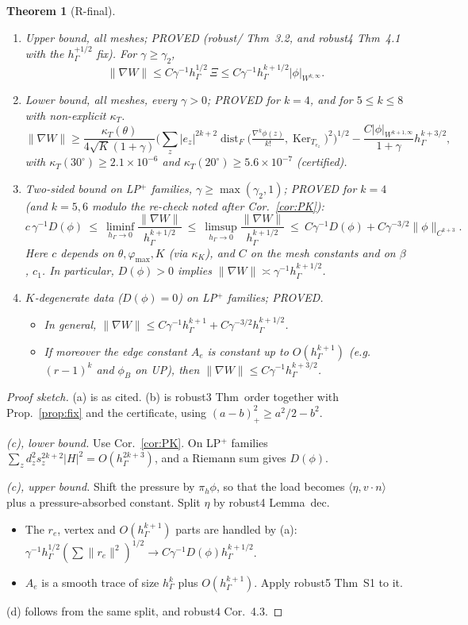 \documentclass[11pt]{article}
\newtheorem{theorem}{Theorem}[section]
\theoremstyle{remark}
\newcommand{\hG}{h_\Gamma}
\newcommand{\ip}[2]{\langle #1,#2\rangle}
\begin{document}
\begin{theorem}[R-final]
\begin{enumerate}
\item[(a)] \emph{Upper bound, all meshes; PROVED} (robust/ Thm~3.2, and robust4 Thm~4.1 with the $\hG^{+1/2}$ fix). For $\gamma\ge\gamma_2$,
\[
\|\nabla W\|\le C\gamma^{-1}\hG^{1/2}\,\Xi\le C\gamma^{-1}\hG^{k+1/2}|\phi|_{W^{k,\infty}}.
\]
\item[(b)] \emph{Lower bound, all meshes, every $\gamma>0$; PROVED for $k=4$, and for $5\le k\le8$ with non-explicit $\kappa_T$.}
\[
\|\nabla W\|\ge\frac{\kappa_T(\theta)}{4\sqrt K(1+\gamma)}\Big(\sum_z|e_z|^{2k+2}\operatorname{dist}_F\big(\tfrac{\nabla^k\phi(z)}{k!},\operatorname{Ker}_{T_{e_z}}\big)^2\Big)^{1/2}
-\frac{C|\phi|_{W^{k+1,\infty}}}{1+\gamma}\hG^{k+3/2},
\]
with $\kappa_T(30^\circ)\ge2.1\times10^{-6}$ and $\kappa_T(20^\circ)\ge5.6\times10^{-7}$ (certified).
\item[(c)] \emph{Two-sided bound on LP$^+$ families, $\gamma\ge\max(\gamma_2,1)$; PROVED for $k=4$} (and $k=5,6$ modulo the re-check noted
after Cor.~\ref{cor:PK}):
\[
c\,\gamma^{-1}D(\phi)\ \le\ \liminf_{\hG\to0}\frac{\|\nabla W\|}{\hG^{k+1/2}}\ \le\ \limsup_{\hG\to0}\frac{\|\nabla W\|}{\hG^{k+1/2}}\ \le\
C\gamma^{-1}D(\phi)+C\gamma^{-3/2}\|\phi\|_{C^{k+3}} .
\]
Here $c$ depends on $\theta,\varphi_{\max},K$ (via $\kappa_K$), and $C$ on the mesh constants and on $\beta$, $c_1$. In particular, $D(\phi)>0$
implies $\|\nabla W\|\asymp\gamma^{-1}\hG^{k+1/2}$.
\item[(d)] \emph{$K$-degenerate data ($D(\phi)=0$) on LP$^+$ families; PROVED.}
\begin{itemize}
\item In general, $\|\nabla W\|\le C\gamma^{-1}\hG^{k+1}+C\gamma^{-3/2}\hG^{k+1/2}$.
\item If moreover the edge constant $A_e$ is constant up to $O(\hG^{k+1})$ (e.g.\ $(r-1)^k$ and $\phi_B$ on \textsf{UP}), then
$\|\nabla W\|\le C\gamma^{-1}\hG^{k+3/2}$.
\end{itemize}
\end{enumerate}
\end{theorem}
\begin{proof}[Proof sketch]
(a) is as cited. (b) is robust3 Thm~order together with Prop.~\ref{prop:fix} and the certificate, using $(a-b)_+^2\ge a^2/2-b^2$.

\emph{(c), lower bound.} Use Cor.~\ref{cor:PK}. On LP$^+$ families $\sum_zd_z^2s_z^{2k+2}|H|^2=O(\hG^{2k+3})$, and a Riemann sum gives $D(\phi)$.

\emph{(c), upper bound.} Shift the pressure by $\pi_h\phi$, so that the load becomes $\ip\eta{v\cdot n}$ plus a pressure-absorbed constant. Split $\eta$
by robust4 Lemma~dec.
\begin{itemize}
\item The $r_e$, vertex and $O(\hG^{k+1})$ parts are handled by (a): $\gamma^{-1}\hG^{1/2}(\sum\|r_e\|^2)^{1/2}\to C\gamma^{-1}D(\phi)\hG^{k+1/2}$.
\item $A_e$ is a smooth trace of size $\hG^k$ plus $O(\hG^{k+1})$. Apply robust5 Thm~S1 to it.
\end{itemize}
(d) follows from the same split, and robust4 Cor.~4.3.
\end{proof}
\end{document}
